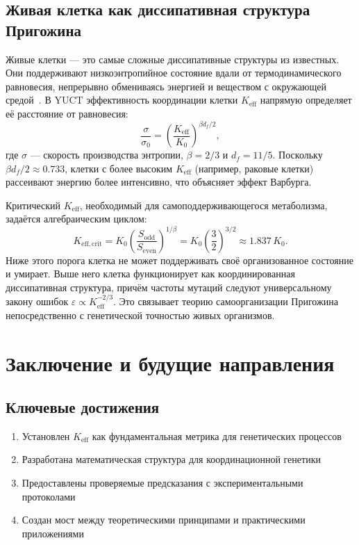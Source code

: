 \documentclass[12pt]{article}
\newcommand{\Keff}{K_{\mathrm{eff}}}
\begin{document}
	\subsection{Живая клетка как диссипативная структура Пригожина}
	\label{subsec:prigogine}
	
	Живые клетки — это самые сложные диссипативные структуры из известных. Они поддерживают низкоэнтропийное состояние вдали от термодинамического равновесия, непрерывно обмениваясь энергией и веществом с окружающей средой~\cite{Prigogine1977}. В YUCT эффективность координации клетки $\Keff$ напрямую определяет её расстояние от равновесия:
	\begin{equation}
		\frac{\sigma}{\sigma_0} = \left( \frac{\Keff}{K_0} \right)^{\beta d_f / 2},
	\end{equation}
	где $\sigma$ — скорость производства энтропии, $\beta=2/3$ и $d_f=11/5$. Поскольку $\beta d_f / 2 \approx 0.733$, клетки с более высоким $\Keff$ (например, раковые клетки) рассеивают энергию более интенсивно, что объясняет эффект Варбурга.
	
	Критический $\Keff$, необходимый для самоподдерживающегося метаболизма, задаётся алгебраическим циклом:
	\begin{equation}
		K_{\mathrm{eff},\mathrm{crit}} = K_0 \left( \frac{S_{\mathrm{odd}}}{S_{\mathrm{even}}} \right)^{1/\beta}
		= K_0 \left( \frac{3}{2} \right)^{3/2} \approx 1.837\,K_0 .
	\end{equation}
	Ниже этого порога клетка не может поддерживать своё организованное состояние и умирает. Выше него клетка функционирует как координированная диссипативная структура, причём частоты мутаций следуют универсальному закону ошибок $\varepsilon \propto \Keff^{-2/3}$. Это связывает теорию самоорганизации Пригожина непосредственно с генетической точностью живых организмов.
	
	\section{Заключение и будущие направления}
	
	\subsection{Ключевые достижения}
	
	\begin{enumerate}
		\item Установлен $K_{\text{eff}}$ как фундаментальная метрика для генетических процессов
		\item Разработана математическая структура для координационной генетики
		\item Предоставлены проверяемые предсказания с экспериментальными протоколами
		\item Создан мост между теоретическими принципами и практическими приложениями
	\end{enumerate}
	
\end{document}
